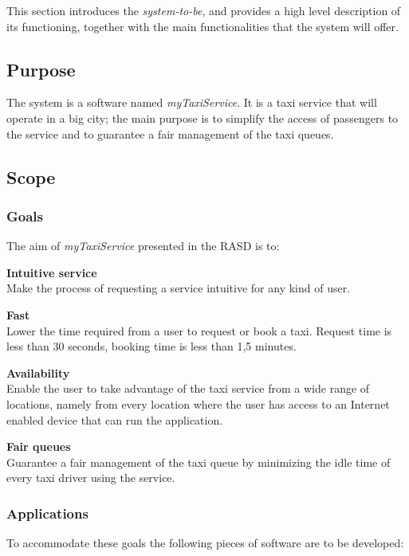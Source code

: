 This section introduces the \emph{system-to-be}, and provides a high level description of its functioning, together with the main functionalities that the system will offer.


\subsection{Purpose}

The system is a software named \emph{myTaxiService}. It is a taxi service that will operate in a big city; the main purpose is to simplify the access of passengers to the service and to guarantee a fair management of the taxi queues.

\subsection{Scope}
\label{sub:scope}
\subsubsection{Goals} %
\label{ssub:goals}
The aim of \emph{myTaxiService} presented in the RASD is to:
\begin{enumerate} [label = \textbf{[G\arabic*]}]
\item \textbf{Intuitive service}\hfill \\
\label{goal:intuitive}
Make the process of requesting a service intuitive for any kind of user.
\item \textbf{Fast}\hfill \\
\label{goal:time}
Lower the time required from a user to request or book a taxi. Request time is less than 30 seconds, booking time is less than 1,5 minutes.
\item \textbf{Availability}\hfill \\
\label{goal:availability}
Enable the user to take advantage of the taxi service from a wide range of locations, namely from every location where the user has access to an Internet enabled device that can run the application.
\item \textbf{Fair queues}\hfill \\
\label{goal:queue}
Guarantee a fair management of the taxi queue by minimizing the idle time of every taxi driver using the service.
\end{enumerate}

\subsubsection{Applications} %
\label{ssub:applications}
To accommodate these goals the following pieces of software are to be developed:


